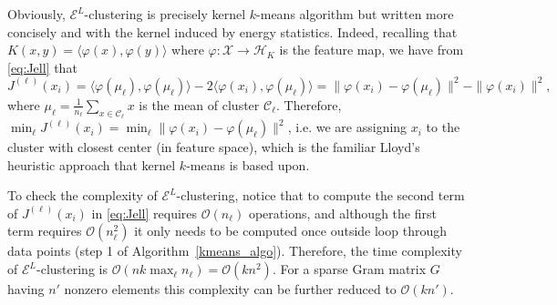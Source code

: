 \documentclass[aps,preprint,nofootinbib,floatfix]{revtex4-1}
\newcommand\kk{K}
\newcommand\C{{\mathcal{C}}}
\newcommand\OO{{\mathcal{O}}}
\begin{document}
Obviously, $\mathcal{E}^{L}$-clustering is precisely
kernel $k$-means algorithm \cite{Dhillon2,Dhillon} 
but written more concisely and with the kernel induced by energy statistics. Indeed, recalling that
$\kk(x,y)=\langle \varphi(x), \varphi(y) \rangle$ where $\varphi: \mathcal{X}
\to \mathcal{H}_\kk$ is the feature map, we have from \eqref{eq:Jell} that
\begin{equation}
J^{(\ell)}(x_i) 
= 
\langle \varphi(\mu_\ell), \varphi(\mu_\ell) \rangle
-2 \langle \varphi(x_i), \varphi(\mu_\ell) \rangle 
= 
\| \varphi(x_i) - \varphi(\mu_\ell) \|^2 - \| \varphi(x_i) \|^2,
\end{equation}
where $\mu_\ell = \tfrac{1}{n_\ell} \sum_{x\in \C_\ell}x$ 
is the mean of cluster $\C_\ell$. 
Therefore, $\min_\ell J^{(\ell)}(x_i) = 
\min_\ell \| \varphi(x_i) - \varphi(\mu_\ell)\|^2$, i.e. we are assigning
$x_i$ to the cluster with closest center (in feature space),
which is the familiar Lloyd's
heuristic approach that kernel $k$-means is based upon.

To check the complexity of $\mathcal{E}^L$-clustering, 
notice that to compute the second term of $J^{(\ell)}(x_i)$
in \eqref{eq:Jell} requires
$\OO(n_\ell)$ operations, and although the first term requires
$\OO(n_\ell^2)$ it only needs to be computed once outside loop through
data points (step 1 of Algorithm~\ref{kmeans_algo}).
Therefore, the time complexity of $\mathcal{E}^L$-clustering 
is
$\OO(n k \max_\ell n_\ell) = \OO(k n^2)$. For a sparse
Gram matrix $G$ having
$n'$ nonzero elements this complexity can be further reduced
to $\OO(k n')$. 
\end{document}
